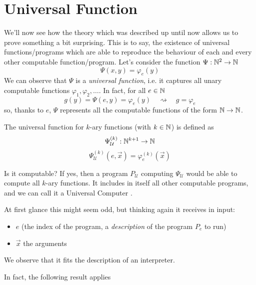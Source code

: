 \chapter {Universal Function}
\newcommand{\Psiex}{\ensuremath{\Psi_{\mathcal{U}}^{(k)} (e, \vec{x})}}
\newcommand{\Psiuex}{\ensuremath{\Psi_e^{(k)} (\vec{x})}}
\newcommand{\univ}{\ensuremath{\Psi_{\mathcal{U}}}}
We'll now see how the theory which was described up until now allows us to
prove something a bit surprising. This is to say, the existence of
universal functions/programs which are able to reproduce the behaviour of each
and every other computable function/program. 
Let's consider the function $\Psi : \mathbb{N}^{2} \rightarrow \mathbb{N}$
\[
  \Psi(x,y) = \varphi_e(y)
\]
We can observe that $\Psi$ is a \emph{universal function}, i.e. it
captures all unary computable functions $\varphi_1, \varphi_2, \dots$. In fact,
for all $e \in \mathbb{N}$
\[
  g(y) = \Psi(e,y) = \varphi_e(y) \quad \rightsquigarrow \quad g = \varphi_e
\]
so, thanks to $e$, $\Psi$ represents all the computable functions of the
form $\mathbb{N} \to \mathbb{N}$.

\begin{definition}
  The universal function for $k$-ary functions (with $k \in \mathbb{N}$) is
  defined as
  \[
    \univ^{(k)} : \nat^{k+1} \rightarrow \nat
  \]
  \[
    \Psiex = \varphi_e^{(k)}(\vec{x})
  \]
\end{definition}
Is it computable? If yes, then a program $P_{\mathcal{U}}$ computing $\univ$ would
be able to compute all $k$-ary functions. It includes in itself all
other computable programs, and we can call it a Universal Computer
\cite{davis:2011}.

At first glance this might seem odd, but thinking again it receives in
input:
\begin{itemize}
\item $e$ (the index of the program, a \textit{description} of the
  program $P_e$ to run)
\item $\vec{x}$ the arguments
\end{itemize}
We observe that it fits the description of an interpreter.

In fact, the following result applies

